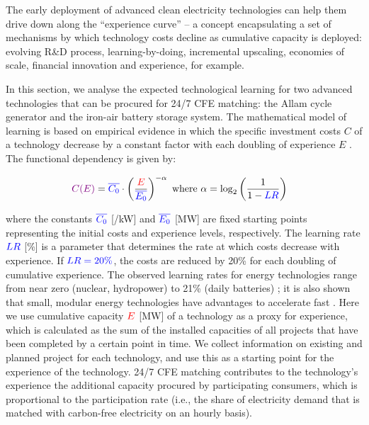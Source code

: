 \documentclass[pdflatex,sn-basic, Numbered]{sn-jnl}
\theoremstyle{thmstyleone}%
\theoremstyle{thmstyletwo}%
\theoremstyle{thmstylethree}%
\begin{document}
The early deployment of advanced clean electricity technologies can help them drive down along the \enquote{experience curve} -- a concept encapsulating a set of mechanisms by which technology costs decline as cumulative capacity is deployed: evolving R\&D process, learning-by-doing, incremental upscaling, economies of scale, financial innovation and experience, for example.

In this section, we analyse the expected technological learning for two advanced technologies that can be procured for 24/7 CFE matching: the Allam cycle generator and the iron-air battery storage system.
The mathematical model of learning is based on empirical evidence in which the speciﬁc investment costs $C$ of a technology decrease by a constant factor with each doubling of experience $E$ \cite{wayEmpiricallyGroundedTechnology2022a}. The functional dependency is given by:

\begin{equation}
  \begin{aligned}
    \color{violet}C(E)\color{black} &= \color{blue}\overline{C_0}\color{black}  \cdot \left( \frac{\color{red}E}{\color{blue}\overline{E_0}\color{black}} \right)^{-\color{black}\alpha} \text{ where } \color{black}\alpha = \color{black}\log_2 \left( \frac{1}{1 - \color{blue}LR\color{black}} \right)
    \label{eq:learning_curve}
  \end{aligned}
\end{equation}

\noindent where the constants $\color{blue}\overline{C_0}$ [\officialeuro/kW] and $\color{blue}\overline{E_0}$ [MW] are fixed starting points representing the initial costs and experience levels, respectively. The learning rate $\color{blue}LR$ [\%] is a parameter that determines the rate at which costs decrease with experience.
If $\color{blue}LR=20\%$, the costs are reduced by 20\% for each doubling of cumulative experience.
The observed learning rates for energy technologies range from near zero (nuclear, hydropower) to 21\% (daily batteries) \cite{waySuppplementaryMaterialsEmpirically2022}; it is also shown that small, modular energy technologies have advantages to accelerate fast \cite{wilsonGranularTechnologiesAccelerate2020}.
Here we use cumulative capacity $\color{red}E$ [MW] of a technology as a proxy for experience, which is calculated as the sum of the installed capacities of all projects that have been completed by a certain point in time.
We collect information on existing and planned project for each technology, and use this as a starting point for the experience of the technology. 24/7 CFE matching contributes to the technology's experience the additional capacity procured by participating consumers, which is proportional to the participation rate (i.e., the share of electricity demand that is matched with carbon-free electricity on an hourly basis).
\end{document}
